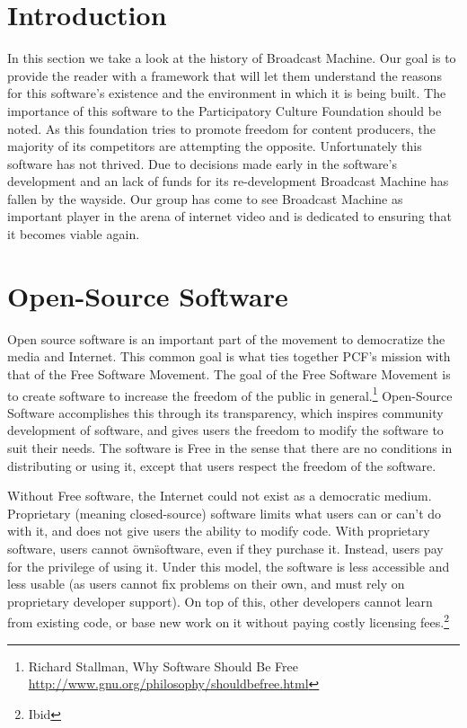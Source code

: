 \documentclass[a4paper,12pt]{report}
\begin{document}
\section{Introduction}
In this section we take a look at the history of Broadcast Machine.
Our goal is to provide the reader with a framework that will let them understand the reasons for this software's existence and the environment in which it is being built.
The importance of this software to the Participatory Culture Foundation should be noted.
As this foundation tries to promote freedom for content producers, the majority of its competitors are attempting the opposite.
Unfortunately this software has not thrived.
Due to decisions made early in the software's development and an lack of funds for its re-development Broadcast Machine has fallen by the wayside.
Our group has come to see Broadcast Machine as important player in the arena of internet video and is dedicated to ensuring that it becomes viable again.

\section{Open-Source Software}
Open source software is an important part of the movement to democratize the media and Internet. 
This common goal is what ties together PCF's mission with that of the Free Software Movement. 
The goal of the Free Software Movement is to create software to increase the freedom of the public in general.\footnote{Richard Stallman, Why Software Should Be Free \url{http://www.gnu.org/philosophy/shouldbefree.html}}
Open-Source Software accomplishes this through its transparency, which inspires community development of software, and gives users the freedom to modify the software to suit their needs.
The software is Free in the sense that there are no conditions in distributing or using it, except that users respect the freedom of the software.

Without Free software, the Internet could not exist as a democratic medium.
Proprietary (meaning closed-source) software limits what users can or can't do with it, and does not give users the ability to modify code.
With proprietary software, users cannot \"own\" software, even if they purchase it.
Instead, users pay for the privilege of using it.
Under this model, the software is less accessible and less usable (as users cannot fix problems on their own, and must rely on proprietary developer support).
On top of this, other developers cannot learn from existing code, or base new work on it without paying costly licensing fees.\footnote{Ibid} 
\end{document}
